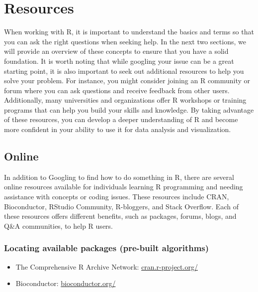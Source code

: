 \documentclass[
]{book}
\begin{document}
\hypertarget{resources}{%
\section*{Resources}\label{resources}}

When working with R, it is important to understand the basics and terms so that you can ask the right questions when seeking help. In the next two sections, we will provide an overview of these concepts to ensure that you have a solid foundation. It is worth noting that while googling your issue can be a great starting point, it is also important to seek out additional resources to help you solve your problem. For instance, you might consider joining an R community or forum where you can ask questions and receive feedback from other users. Additionally, many universities and organizations offer R workshops or training programs that can help you build your skills and knowledge. By taking advantage of these resources, you can develop a deeper understanding of R and become more confident in your ability to use it for data analysis and visualization.

\hypertarget{online}{%
\subsection*{Online}\label{online}}

In addition to Googling to find how to do something in R, there are several online resources available for individuals learning R programming and needing assistance with concepts or coding issues. These resources include CRAN, Bioconductor, RStudio Community, R-bloggers, and Stack Overflow. Each of these resources offers different benefits, such as packages, forums, blogs, and Q\&A communities, to help R users.

\hypertarget{locating-available-packages-pre-built-algorithms}{%
\subsubsection*{Locating available packages (pre-built algorithms)}\label{locating-available-packages-pre-built-algorithms}}

\begin{itemize}
\item
  The Comprehensive R Archive Network: \href{https://cran.r-project.org/}{cran.r-project.org/}
\item
  Bioconductor: \href{https://bioconductor.org/}{bioconductor.org/}
\end{itemize}
\end{document}
